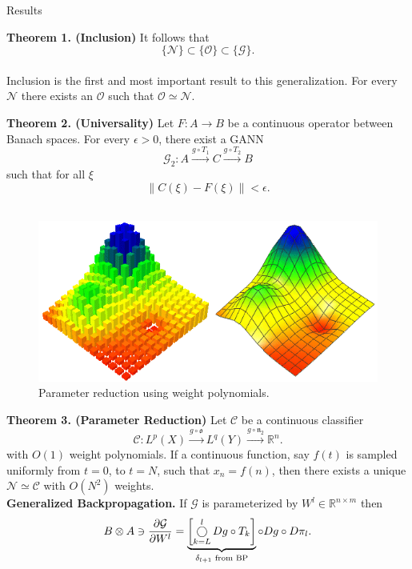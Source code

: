 


\begin{alertblock}{Results}
	
 \textbf{Theorem 1. (Inclusion)} It follows that $$\{\mathcal{N}\} \subset \{\mathcal{O}\} \subset \{\mathcal{G}\}.$$ \\
 \setlength\parindent{24pt}
 \indent Inclusion is the first and most important result to this generalization. For every $\mathcal{N}$ there exists an $\mathcal{O}$ such that $\mathcal{O} \simeq \mathcal{N}.$ \\[0.7cm]
  \setlength\parindent{0pt}


  \textbf{Theorem 2. (Universality) } Let $F: A \to B$ be a continuous operator between Banach spaces. For every $\epsilon > 0$, there exist a GANN
$$  \mathcal{G}_2: A 	 \xrightarrow{g \circ T_1} C \xrightarrow{g \circ T_2} B$$
such that for all $\xi$
$$ \| {C}(\xi) -  F(\xi) \| < \epsilon.$$ \\[0.7cm]


	\begin{figure}
		 	\includegraphics[width=0.6\onecolwid]{gc082_1.png}
		 	\caption{Parameter reduction using weight polynomials.}
	\end{figure}

\textbf{Theorem 3. (Parameter Reduction)} 
Let $\mathcal{C}$ be a continuous classifier
$$\mathcal{C}:  L^p(X) 	 \xrightarrow{g \circ \mathfrak{o}} L^q(Y) \xrightarrow{g \circ \mathfrak{n}_2}  \mathbb{R}^n.$$ with $O(1)$ weight polynomials.  If a continuous function, say $f(t)$ is sampled uniformly from $t = 0$, to $t = N$, such that $x_n = f(n)$,  then there exists a unique $\mathcal{N} \simeq \mathcal{C}$ with  $O(N^2)$ weights. \\[0.7cm]

\textbf{Generalized Backpropagation.} If $\mathcal{G}$ is parameterized by $W^{l} \in \mathbb{R}^{n\times m}$ then
\begin{equation*}
	B \otimes A \ni \frac{\partial \mathcal{G}}{\partial W^l} =
	   \underbrace{\left[\bigcomp_{k=L}^{l}  Dg \circ T_k\right]}_{\delta_{l+1}\text{ from BP}} \circ Dg \circ D\pi_l.
\end{equation*}

\end{alertblock}	


